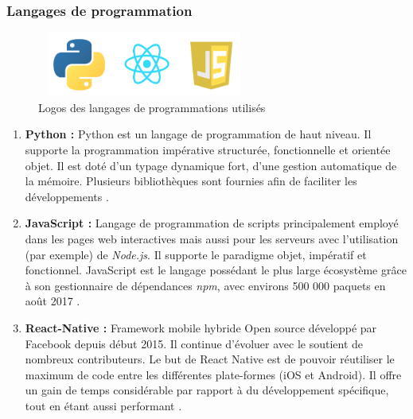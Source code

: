         \subsubsection{Langages de programmation}
            \begin{figure}[H]
                    \centering
                    \includegraphics[height=60pt,width=200pt]{img/chapter4/tools/language.png}
                    \caption{Logos des langages de programmations utilisés}
                    \label{}
            \end{figure}
            \begin{enumerate}[leftmargin=*]
                \item{\textbf{Python : }}
                Python est un langage de programmation de haut niveau. Il supporte la programmation impérative structurée, fonctionnelle et orientée objet. Il est doté d'un typage dynamique fort, d'une gestion automatique de la mémoire. Plusieurs bibliothèques sont fournies afin de faciliter les développements \cite{python}.\\

                \item{\textbf{JavaScript : }}
                Langage de programmation de scripts principalement employé dans les pages web interactives mais aussi pour les serveurs avec l'utilisation (par exemple) de \emph{Node.js}. Il supporte le paradigme objet, impératif et fonctionnel. JavaScript est le langage possédant le plus large écosystème grâce à son gestionnaire de dépendances \emph{npm}, avec environs 500 000 paquets en août 2017 \cite{javascript}.\\

                \item{\textbf{React-Native : }}
                Framework mobile hybride Open source développé par Facebook depuis début 2015. Il continue d'évoluer avec le soutient de nombreux contributeurs. Le but de React Native est de pouvoir réutiliser le maximum de code entre les différentes plate-formes (iOS et Android). Il offre un gain de temps considérable par rapport à du développement spécifique, tout en étant aussi performant \cite{reactnative}.
            \end{enumerate}

